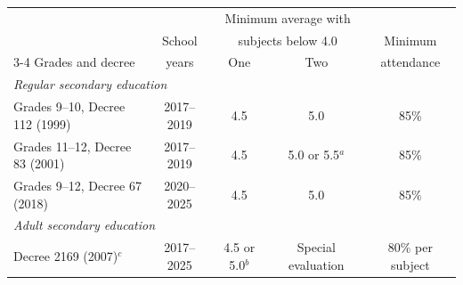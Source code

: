 \begin{tabular}{lcccc}
\toprule
 & & \multicolumn{2}{c}{Minimum average with} & \\
 & School & \multicolumn{2}{c}{subjects below 4.0} & Minimum \\
\cmidrule(lr){3-4}
Grades and decree & years & One & Two & attendance \\
\midrule
\multicolumn{5}{l}{\textit{Regular secondary education}}\\
\quad Grades 9--10, Decree 112 (1999) & 2017--2019 & 4.5 & 5.0 & 85\%\\
\quad Grades 11--12, Decree 83 (2001) & 2017--2019 & 4.5 & 5.0 or 5.5$^{a}$ & 85\%\\
\quad Grades 9--12, Decree 67 (2018) & 2020--2025 & 4.5 & 5.0 & 85\%\\
\multicolumn{5}{l}{\textit{Adult secondary education}}\\
\quad Decree 2169 (2007)$^{c}$ & 2017--2025 & 4.5 or 5.0$^{b}$ & Special evaluation & 80\% per subject\\
\bottomrule
\end{tabular}
